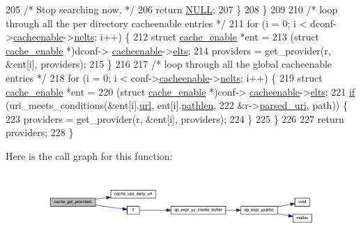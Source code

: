 \begin{DoxyCode}
205             \textcolor{comment}{/* Stop searching now. */}
206             \textcolor{keywordflow}{return} \hyperlink{pcre_8txt_ad7f989d16aa8ca809a36bc392c07fba1}{NULL};
207         \}
208     \}
209 
210     \textcolor{comment}{/* loop through all the per directory cacheenable entries */}
211     \textcolor{keywordflow}{for} (i = 0; i < dconf->\hyperlink{structcache__dir__conf_a12a954532411f0c7534f8b1d77e433f4}{cacheenable}->\hyperlink{structapr__array__header__t_ab11b88220885c5a0920a06ac85680055}{nelts}; i++) \{
212         \textcolor{keyword}{struct }\hyperlink{structcache__enable}{cache\_enable} *ent =
213                                 (\textcolor{keyword}{struct }\hyperlink{structcache__enable}{cache\_enable} *)dconf->
      \hyperlink{structcache__dir__conf_a12a954532411f0c7534f8b1d77e433f4}{cacheenable}->\hyperlink{structapr__array__header__t_af8462fa2a1ddf6406c66cd3dd441a269}{elts};
214         providers = get\_provider(r, &ent[i], providers);
215     \}
216 
217     \textcolor{comment}{/* loop through all the global cacheenable entries */}
218     \textcolor{keywordflow}{for} (i = 0; i < conf->\hyperlink{structcache__server__conf_aaa7a7b0ab522f181bde5376c2673a9b4}{cacheenable}->\hyperlink{structapr__array__header__t_ab11b88220885c5a0920a06ac85680055}{nelts}; i++) \{
219         \textcolor{keyword}{struct }\hyperlink{structcache__enable}{cache\_enable} *ent =
220                                 (\textcolor{keyword}{struct }\hyperlink{structcache__enable}{cache\_enable} *)conf->
      \hyperlink{structcache__server__conf_aaa7a7b0ab522f181bde5376c2673a9b4}{cacheenable}->\hyperlink{structapr__array__header__t_af8462fa2a1ddf6406c66cd3dd441a269}{elts};
221         \hyperlink{util__expr__scan_8c_a33e91cd0cef6786e9e3a27ac67707207}{if} (uri\_meets\_conditions(&ent[i].\hyperlink{group__MOD__PROXY_ga05d2db9f2dd75d18170f192bd1cc9b4e}{url}, ent[i].\hyperlink{structcache__enable_adce5084f188b489662db5aebcc678803}{pathlen},
222                                  &r->\hyperlink{structrequest__rec_a778f7883e201095a1d914ab7422635eb}{parsed\_uri}, path)) \{
223             providers = get\_provider(r, &ent[i], providers);
224         \}
225     \}
226 
227     \textcolor{keywordflow}{return} providers;
228 \}
\end{DoxyCode}


Here is the call graph for this function\+:
\nopagebreak
\begin{figure}[H]
\begin{center}
\leavevmode
\includegraphics[width=350pt]{group__Cache__util_ga3bb0227007e96351ef9b155cd0720abb_cgraph}
\end{center}
\end{figure}




